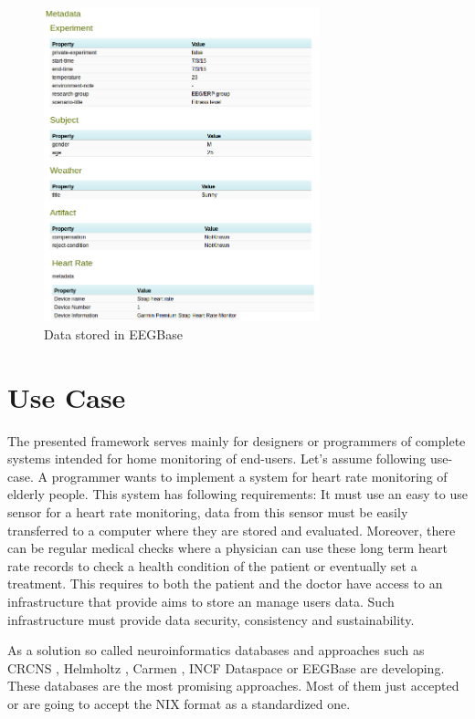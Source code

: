 \documentclass[conference]{IEEEtran}
\begin{document}
\begin{figure}
  \centering\includegraphics[width=8cm]{portal_example.png}
  \caption{Data stored in EEGBase}
  \label{fig:EEGBase}
 \end{figure}


\section{Use Case}\label{sec:use-case}

The presented framework serves mainly for designers or programmers of complete systems intended for home monitoring of end-users. Let's assume following use-case. A programmer wants to implement a system for heart rate monitoring of elderly people. This system has following requirements: It must use an easy to use sensor for a heart rate monitoring, data from this sensor must be easily transferred to a computer where they are stored and evaluated. Moreover, there can be regular medical checks where a physician can use these long term heart rate records to check a health condition of the patient or eventually set a treatment. This requires to both the patient and the doctor have access to an infrastructure that provide aims to store an manage users data. Such infrastructure must provide data security, consistency and sustainability.

As a solution so called neuroinformatics databases and approaches such as CRCNS \cite{CRCNS}, Helmholtz \cite{10.3389/conf.fninf.2013.09.00025}, Carmen \cite{fgibson:Watson2007}, INCF Dataspace \cite{dataspace} or EEGBase \cite{ISI:000306821100004} are developing. These databases are the most promising approaches. Most of them just accepted or are going to accept the NIX format as a standardized one.
\end{document}
